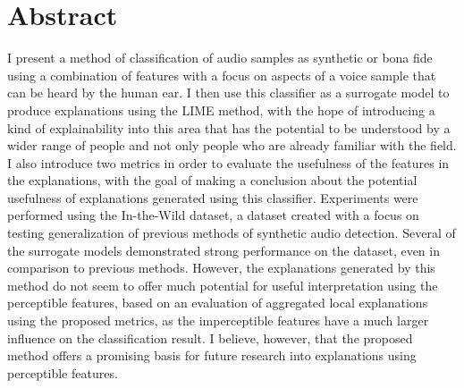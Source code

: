 \documentclass{article}
\begin{document}
    \section{Abstract}
	I present a method of classification of audio samples as synthetic or bona fide using a
	combination of features with a focus on aspects of a voice sample that can be heard by the
	human ear. I then use this classifier as a surrogate model to produce explanations using the
	LIME method, with the hope of introducing a kind of explainability into this area that has
	the potential to be understood by a wider range of people and not only people who are already
	familiar with the field. I also introduce two metrics in order to evaluate the usefulness of
	the features in the explanations, with the goal of making a conclusion about the potential
	usefulness of explanations generated using this classifier. Experiments were performed using
	the In-the-Wild dataset, a dataset created with a focus on testing generalization of previous
	methods of synthetic audio detection. Several of the surrogate models demonstrated strong
	performance on the dataset, even in comparison to previous methods. However, the explanations
	generated by this method do not seem to offer much potential for useful interpretation using the
	perceptible features, based on an evaluation of aggregated local explanations using the
	proposed metrics, as the imperceptible features have a much larger influence on the
	classification result. I believe, however, that the proposed method offers a promising basis
	for future research into explanations using perceptible features.
\end{document}
